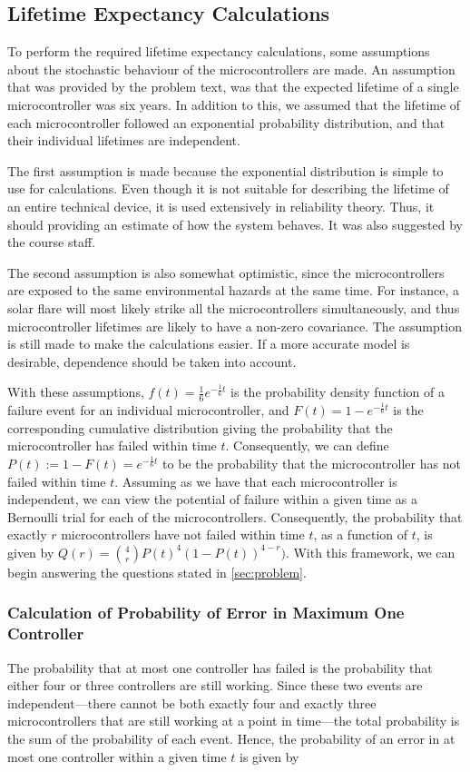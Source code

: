 \subsection{Lifetime Expectancy Calculations}
To perform the required lifetime expectancy calculations, some
assumptions about the stochastic behaviour of the microcontrollers are
made. An assumption that was provided by the problem text, was that
the expected lifetime of a single microcontroller was six years. In
addition to this, we assumed that the lifetime of each microcontroller
followed an exponential probability distribution, and that their
individual lifetimes are independent. 

The first assumption is made because the exponential distribution is
simple to use for calculations. Even though it is not suitable for
describing the lifetime of an entire technical device, it is used
extensively in reliability theory\cite{wikipedia}. Thus, it should
providing an estimate of how the system behaves. It was also suggested
by the course staff.

The second assumption is also somewhat optimistic, since the
microcontrollers are exposed to the same environmental hazards at the
same time. For instance, a solar flare will most likely strike all the
microcontrollers simultaneously, and thus microcontroller lifetimes
are likely to have a non-zero covariance. The assumption is still made
to make the calculations easier. If a more accurate model is
desirable, dependence should be taken into account.

With these assumptions, $f(t) = \frac{1}{6}e^{-\frac{1}{6}t}$ is the
probability density function of a failure event for an individual
microcontroller, and $F(t) = 1 - e^{-\frac{1}{6}t}$ is the
corresponding cumulative distribution giving the probability that the
microcontroller has failed within time $t$. Consequently, we can
define $P(t) := 1 - F(t) = e^{-\frac{1}{6}t}$ to be the probability
that the microcontroller has not failed within time $t$. Assuming as
we have that each microcontroller is independent, we can view the
potential of failure within a given time as a Bernoulli trial for each
of the microcontrollers. Consequently, the probability that exactly
$r$ microcontrollers have not failed within time $t$, as a function of
$t$, is given by $Q(r) = \binom{4}{r}P(t)^4(1 - P(t))^{4 - r})$. With
this framework, we can begin answering the questions stated in
\autoref{sec:problem}.

\subsubsection{Calculation of Probability of Error in Maximum One Controller}
\label{sec:errorinmaxone}
The probability that at most one controller has failed is the
probability that either four or three controllers are still
working. Since these two events are independent---there cannot be both
exactly four and exactly three microcontrollers that are still working
at a point in time---the total probability is the sum of the
probability of each event. Hence, the probability of an error in at
most one controller within a given time $t$ is given by

